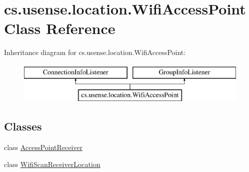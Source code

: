 \hypertarget{classcs_1_1usense_1_1location_1_1_wifi_access_point}{}\section{cs.\+usense.\+location.\+Wifi\+Access\+Point Class Reference}
\label{classcs_1_1usense_1_1location_1_1_wifi_access_point}
Inheritance diagram for cs.\+usense.\+location.\+Wifi\+Access\+Point\+:\begin{figure}[H]
\begin{center}
\leavevmode
\includegraphics[height=2.000000cm]{classcs_1_1usense_1_1location_1_1_wifi_access_point}
\end{center}
\end{figure}
\subsection*{Classes}
\begin{DoxyCompactItemize}
\item 
class \hyperlink{classcs_1_1usense_1_1location_1_1_wifi_access_point_1_1_access_point_receiver}{Access\+Point\+Receiver}
\item 
class \hyperlink{classcs_1_1usense_1_1location_1_1_wifi_access_point_1_1_wifi_scan_receiver_location}{Wifi\+Scan\+Receiver\+Location}
\end{DoxyCompactItemize}
